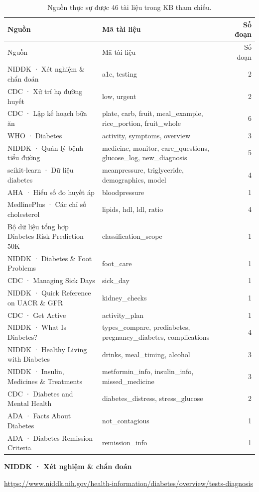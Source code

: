 \begin{longtable}{p{5cm}p{8cm}r}\caption{Nguồn thực sự được 46 tài liệu trong KB tham chiếu.}\label{tab:kb-sources}\\\toprule Nguồn & Mã tài liệu & Số đoạn\\\midrule\endfirsthead\toprule Nguồn & Mã tài liệu & Số đoạn\\\midrule\endhead
NIDDK · Xét nghiệm \& chẩn đoán & a1c, testing & 2\\
CDC · Xử trí hạ đường huyết & low, urgent & 2\\
CDC · Lập kế hoạch bữa ăn & plate, carb, fruit, meal\_example, rice\_portion, fruit\_whole & 6\\
WHO · Diabetes & activity, symptoms, overview & 3\\
NIDDK · Quản lý bệnh tiểu đường & medicine, monitor, care\_questions, glucose\_log, new\_diagnosis & 5\\
scikit-learn · Dữ liệu diabetes & meanpressure, triglyceride, demographics, model & 4\\
AHA · Hiểu số đo huyết áp & bloodpressure & 1\\
MedlinePlus · Các chỉ số cholesterol & lipids, hdl, ldl, ratio & 4\\
Bộ dữ liệu tổng hợp Diabetes Risk Prediction 50K & classification\_scope & 1\\
NIDDK · Diabetes \& Foot Problems & foot\_care & 1\\
CDC · Managing Sick Days & sick\_day & 1\\
NIDDK · Quick Reference on UACR \& GFR & kidney\_checks & 1\\
CDC · Get Active & activity\_plan & 1\\
NIDDK · What Is Diabetes? & types\_compare, prediabetes, pregnancy\_diabetes, complications & 4\\
NIDDK · Healthy Living with Diabetes & drinks, meal\_timing, alcohol & 3\\
NIDDK · Insulin, Medicines \& Treatments & metformin\_info, insulin\_info, missed\_medicine & 3\\
CDC · Diabetes and Mental Health & diabetes\_distress, stress\_glucose & 2\\
ADA · Facts About Diabetes & not\_contagious & 1\\
ADA · Diabetes Remission Criteria & remission\_info & 1\\\bottomrule\end{longtable}\noindent\textbf{NIDDK · Xét nghiệm \& chẩn đoán}\par\noindent\url{https://www.niddk.nih.gov/health-information/diabetes/overview/tests-diagnosis}\par\medskip

